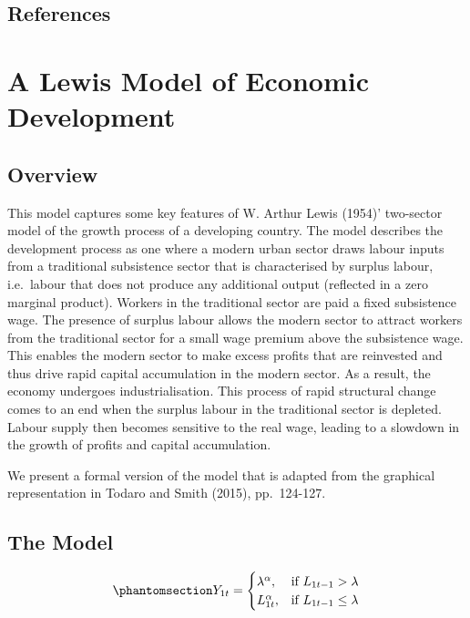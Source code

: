 \documentclass[
  letterpaper,
  DIV=11,
  numbers=noendperiod]{scrreprt}
\begin{document}
\section{References}\label{references-13}

\chapter{A Lewis Model of Economic Development}\label{sec-lewis}

\section{Overview}\label{overview-11}

This model captures some key features of W. Arthur Lewis (1954)'
two-sector model of the growth process of a developing country. The
model describes the development process as one where a modern urban
sector draws labour inputs from a traditional subsistence sector that is
characterised by surplus labour, i.e.~labour that does not produce any
additional output (reflected in a zero marginal product). Workers in the
traditional sector are paid a fixed subsistence wage. The presence of
surplus labour allows the modern sector to attract workers from the
traditional sector for a small wage premium above the subsistence wage.
This enables the modern sector to make excess profits that are
reinvested and thus drive rapid capital accumulation in the modern
sector. As a result, the economy undergoes industrialisation. This
process of rapid structural change comes to an end when the surplus
labour in the traditional sector is depleted. Labour supply then becomes
sensitive to the real wage, leading to a slowdown in the growth of
profits and capital accumulation.

We present a formal version of the model that is adapted from the
graphical representation in Todaro and Smith (2015), pp.~124-127.

\section{The Model}\label{the-model-12}

\begin{equation}\phantomsection\label{eq-lewis_Y1}{
    Y_{1t}= 
\begin{cases}
    \lambda^\alpha, &    \text{if } L_{1t-1} > \lambda \\
    L^\alpha_{1t},& \text{if } L_{1t-1}\leq \lambda
\end{cases}
}\end{equation}
\end{document}
